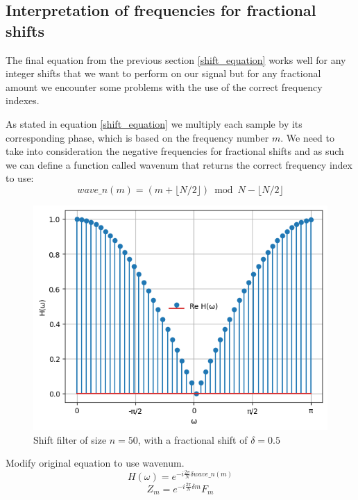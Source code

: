 \documentclass[]{usiinfbachelorproject}
\begin{document}
	\subsection{Interpretation of frequencies for fractional shifts}
	The final equation from the previous section \ref{shift_equation} works well for any integer shifts that we want to perform on our signal but for any fractional amount we encounter some problems with the use of the correct frequency indexes.

	
	
	As stated in equation \ref{shift_equation} we multiply each sample by its corresponding phase, which is based on the frequency number $m$.
	We need to take into consideration the negative frequencies for fractional shifts  and as such we can define a function called wavenum that returns the correct frequency index to use:
	\begin{equation*}
		wave\_n(m) = (m + \lfloor N/2 \rfloor ) \bmod N - \lfloor N/2 \rfloor
	\end{equation*}

	\begin{figure}[H]
		\centering
		\includegraphics[width=0.5\columnwidth]{images/good_shift_filter.png}
		\caption{Shift filter of size $n=50$, with a fractional shift of $\delta=0.5$}
	\end{figure}
	Modify original equation to use wavenum.
	\begin{equation*}
		H(\omega) = e^{-i \frac{2\pi}{N}  \delta wave\_n(m)}
	\end{equation*}
	\begin{equation}\label{phase_shift_equation}
		Z_m = e^{-i \frac{2\pi}{N}  \delta m} F_m 
	\end{equation}	
	
	
\end{document}
